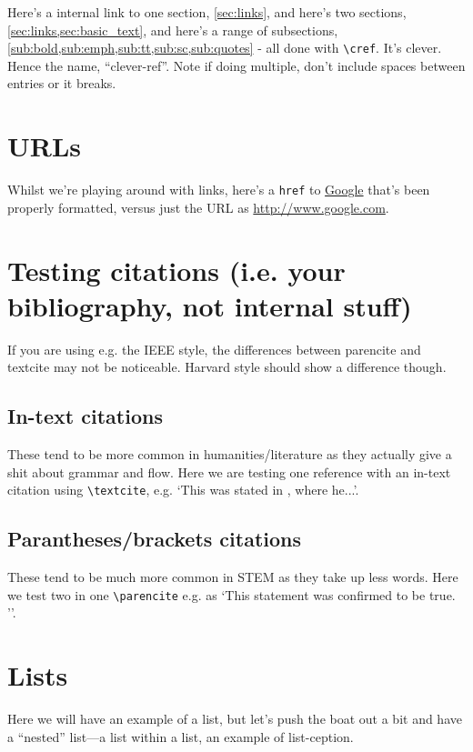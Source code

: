 \documentclass[../main]{subfiles}
\begin{document}
Here's a internal link to one section, \cref{sec:links}, and here's two sections, \cref{sec:links,sec:basic_text}, and here's a range of subsections, \cref{sub:bold,sub:emph,sub:tt,sub:sc,sub:quotes} - all done with \verb|\cref|. It's clever. Hence the name, ``clever-ref''. Note if doing multiple, don't include spaces between entries or it breaks.

\section{URLs}\label{sec:URL}
Whilst we're playing around with links, here's a \verb|href| to \href{http://www.google.com}{Google} that's been properly formatted, versus just the URL as \url{http://www.google.com}. 


\section{Testing citations (i.e. your bibliography, not internal stuff)}\label{sec:ref_test}

If you are using e.g. the IEEE style, the differences between parencite and textcite may not be noticeable. Harvard style should show a difference though.

\subsection{In-text citations}
These tend to be more common in humanities/literature as they actually give a shit about grammar and flow.
Here we are testing one reference with an in-text citation using \verb|\textcite|, e.g. `This was stated in \textcite{einstein}, where he...'. 

\subsection{Parantheses/brackets citations}
These tend to be much more common in STEM as they take up less words. Here we test two in one \verb|\parencite| e.g. as `This statement was confirmed to be true. \parencite{knuthwebsite,latexcompanion}''.


\section{Lists} \label{sec:lists}

Here we will have an example of a list, but let's push the boat out a bit and have a ``nested'' list---a list within a list, an example of list-ception.
\end{document}
